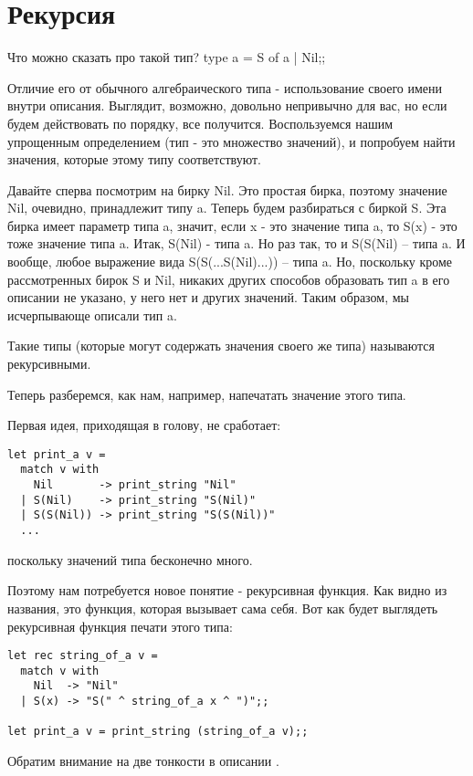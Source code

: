 \section{Рекурсия}

Что можно сказать про такой тип?
type a = S of a | Nil;;

Отличие его от обычного алгебраического типа - использование своего имени 
внутри описания. Выглядит, возможно, довольно непривычно для вас, но если
будем действовать по порядку, все получится. Воспользуемся нашим упрощенным
определением (тип - это множество значений), и попробуем найти значения,
которые этому типу соответствуют.

Давайте сперва посмотрим на бирку Nil. Это простая бирка, поэтому значение
Nil, очевидно, принадлежит типу a.
Теперь будем разбираться с биркой S. Эта бирка имеет параметр типа a, 
значит, если x - это значение типа a, то S(x) - это тоже значение типа a.
Итак, S(Nil) - типа a. Но раз так, то и S(S(Nil) -- типа a.
И вообще, любое выражение вида S(S(...S(Nil)...)) -- типа a. 
Но, поскольку кроме рассмотренных бирок S и Nil, никаких других способов 
образовать тип a в его описании не указано, у него нет и других значений. 
Таким образом, мы исчерпывающе описали тип a.

Такие типы (которые могут содержать значения своего же типа) называются 
рекурсивными. 

Теперь разберемся, как нам, например, напечатать значение этого типа.

Первая идея, приходящая в голову, не сработает:
\begin{verbatim}
let print_a v = 
  match v with
    Nil       -> print_string "Nil"
  | S(Nil)    -> print_string "S(Nil)"
  | S(S(Nil)) -> print_string "S(S(Nil))"
  ...
\end{verbatim}
поскольку значений типа бесконечно много.

Поэтому нам потребуется новое понятие - рекурсивная функция. Как видно из
названия, это функция, которая вызывает сама себя. Вот как будет выглядеть
рекурсивная функция печати этого типа:

\begin{verbatim}
let rec string_of_a v =
  match v with
    Nil  -> "Nil"
  | S(x) -> "S(" ^ string_of_a x ^ ")";;

let print_a v = print_string (string_of_a v);;
\end{verbatim}

Обратим внимание на две тонкости в описании . 

